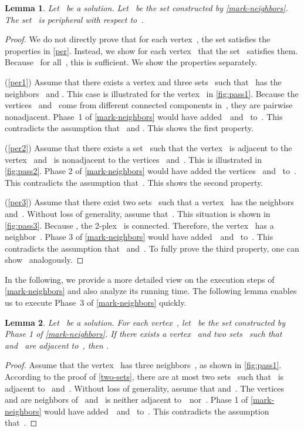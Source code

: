 \documentclass[12pt, a4paper, abstracton]{scrreprt}
\newcommand{\prem}[1]{Let~ be a solution. Let~ be the set constructed by \autoref{#1}.}
\newcounter{theorem}
\newtheorem{lemma}{Lemma}[chapter]
\theoremstyle{definition}
\theoremstyle{remark}
\begin{document}
\begin{lemma}\label{two-sets}
  \prem{mark-neighbors} The set~ is peripheral with respect to~.
\end{lemma}

\begin{proof}
  We do not directly prove that for each vertex~, the set  satisfies the properties in \autoref{per}. Instead, we show for each vertex~ that the set~ satisfies them. Because~ for all~, this is sufficient. We show the properties separately.

  (\ref{per1}) Assume that there exists a vertex  and three sets~ such that~ has the neighbors~ and .  This case is illustrated for the vertex~ in \autoref{fig:pass1}. Because the vertices ~and~ come from different connected components in~, they are pairwise nonadjacent. Phase~1 of \autoref{mark-neighbors} would have added~~and~ to~.  This contradicts the assumption that~ and . This shows the first property.

  (\ref{per2}) Assume that there exists a set~ such that the vertex~ is adjacent to the vertex~ and~ is nonadjacent to the vertices~ and~. This is illustrated in \autoref{fig:pass2}. Phase 2 of \autoref{mark-neighbors} would have added the vertices~ and~ to~. This contradicts the assumption that~. This shows the second property.

  (\ref{per3}) Assume that there exist two sets~ such that a vertex~ has the neighbors~ and~. Without loss of generality, assume that~.  This situation is shown in \autoref{fig:pass3}.  Because , the 2-plex~ is connected. Therefore, the vertex ~has a neighbor~. Phase 3 of \autoref{mark-neighbors} would have added~~and~ to~. This contradicts the assumption that~ and~. To fully prove the third property, one can show~ analogously.
\end{proof}

\noindent In the following, we provide a more detailed view on the execution steps of \autoref{mark-neighbors} and also analyze its running time. The following lemma enables us to execute Phase~3 of \autoref{mark-neighbors} quickly.

\begin{lemma}\label{two-neighbors}
  Let~ be a solution. For each vertex~, let~ be the set constructed by Phase 1 of \autoref{mark-neighbors}. If there exists a vertex~ and two sets~ such that~ and~ are adjacent to~, then .
\end{lemma}

\begin{proof}
  Assume that the vertex~ has three neighbors~, as shown in \autoref{fig:pass1}. According to the proof of \autoref{two-sets}, there are at most two sets~ such that~ is adjacent to~ and~. Without loss of generality, assume that  and~. The vertices~ and  are neighbors of~ and ~is neither adjacent to~~nor~. Phase 1 of \autoref{mark-neighbors} would have added~~and~ to~. This contradicts the assumption that~.
\end{proof}
\end{document}
